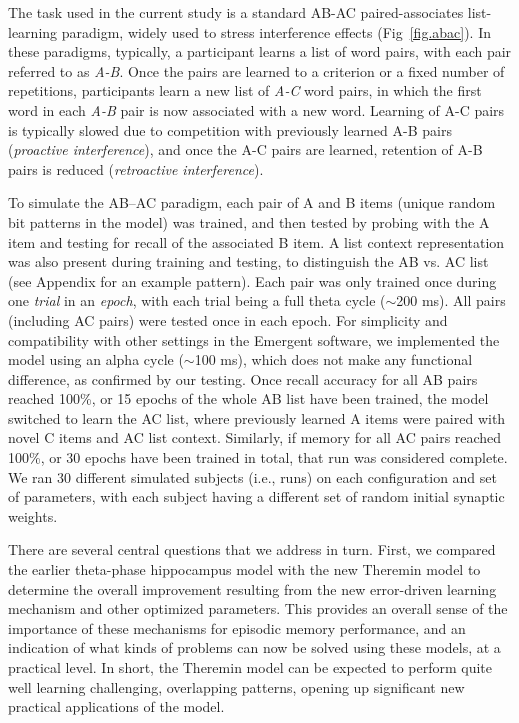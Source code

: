 \documentclass[11pt,twoside]{article}
\newif\myifpdf
\begin{document}
The task used in the current study is a standard AB-AC paired-associates list-learning paradigm, widely used to stress interference effects \citep{BarnesUnderwood59,McCloskeyCohen89} (Fig~\ref{fig.abac}). In these paradigms, typically, a participant learns a list of word pairs, with each pair referred to as \emph{A-B}. Once the pairs are learned to a criterion or a fixed number of repetitions, participants learn a new list of \emph{A-C} word pairs, in which the first word in each \emph{A-B} pair is now associated with a new word. Learning of A-C pairs is typically slowed due to competition with previously learned A-B pairs (\emph{proactive interference}), and once the A-C pairs are learned, retention of A-B pairs is reduced (\emph{retroactive interference}).

To simulate the AB--AC paradigm, each pair of A and B items (unique random bit patterns in the model) was trained, and then tested by probing with the A item and testing for recall of the associated B item.  A list context representation was also present during training and testing, to distinguish the AB vs. AC list (see Appendix for an example pattern).  Each pair was only trained once during one \emph{trial} in an \emph{epoch}, with each trial being a full theta cycle ($\sim$200 ms).  All pairs (including AC pairs) were tested once in each epoch.  For simplicity and compatibility with other settings in the Emergent software, we implemented the model using an alpha cycle ($\sim$100 ms), which does not make any functional difference, as confirmed by our testing.  Once recall accuracy for all AB pairs reached 100\%, or 15 epochs of the whole AB list have been trained, the model switched to learn the AC list, where previously learned A items were paired with novel C items and AC list context. Similarly, if memory for all AC pairs reached 100\%, or 30 epochs have been trained in total, that run was considered complete.  We ran 30 different simulated subjects (i.e., runs) on each configuration and set of parameters, with each subject having a different set of random initial synaptic weights. 

There are several central questions that we address in turn.  First, we compared the earlier theta-phase hippocampus model with the new Theremin model to determine the overall improvement resulting from the new error-driven learning mechanism and other optimized parameters.  This provides an overall sense of the importance of these mechanisms for episodic memory performance, and an indication of what kinds of problems can now be solved using these models, at a practical level.  In short, the Theremin model can be expected to perform quite well learning challenging, overlapping patterns, opening up significant new practical applications of the model.
\end{document}
